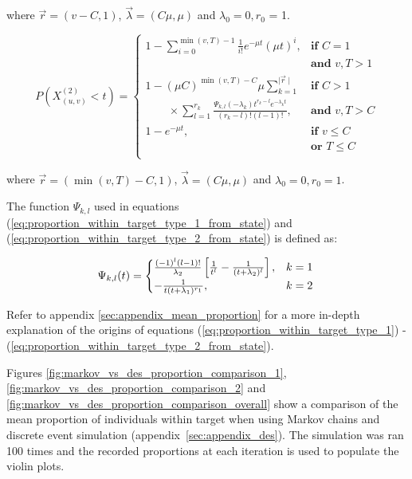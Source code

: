 \noindent
where \(\vec{r}=(v - C, 1)\), \(\vec{\lambda}=(C \mu, \mu)\) and 
\(\lambda_0 = 0, r_0\) = 1. 

\begin{equation}\label{eq:proportion_within_target_type_2_from_state}
    P(X_{(u,v)}^{(2)} < t) = 
    \begin{cases}
        1 - \sum_{i=0}^{\min(v,T)-1} \frac{1}{i!} e^{-\mu t} (\mu t)^i,  
            & \textbf{if } C = 1 \\ 
            & \textbf{and } v, T > 1 \\
        1 - (\mu C) ^ {\min(v,T) - C} \mu  
        \sum_{k=1}^{\mid \vec{r} \mid} & \textbf{if } C > 1 \\
        \qquad \times \sum_{l=1}^{r_k}
        \frac{\Psi_{k,l}(-\lambda_k)t^{r_k - l} 
        e^{-\lambda_k t}}{(r_k - l)! (l - 1)!}, 
            & \textbf{and } v, T  > C\\
        1 - e^{-\mu t}, & \textbf{if } v \leq C \\ 
            & \textbf{or } T \leq C \\
    \end{cases}
\end{equation}

\noindent
where \(\vec{r}=(\min(v, T) - C, 1)\), \(\vec{\lambda}=(C \mu, \mu)\) and
\(\lambda_0 = 0, r_0 = 1\).


The function \(\Psi_{k,l}\) used in equations 
(\ref{eq:proportion_within_target_type_1_from_state}) and 
(\ref{eq:proportion_within_target_type_2_from_state}) is defined as:

\begin{equation}
    \Psi_{k,l}(t) = 
    \begin{cases} 
        \frac{(-1)^{l} (l-1)!}{\lambda_2} \left[\frac{1}{t^l} - \frac{1}
        {(t + \lambda_2)^l}\right] , & k=1 \\
        - \frac{1}{t (t + \lambda_1)^{r_1}}, & k=2
    \end{cases} \nonumber \\
\end{equation}

Refer to appendix \ref{sec:appendix_mean_proportion} for a more in-depth 
explanation of the origins of equations 
(\ref{eq:proportion_within_target_type_1}) - 
(\ref{eq:proportion_within_target_type_2_from_state}).

Figures \ref{fig:markov_vs_des_proportion_comparison_1},
\ref{fig:markov_vs_des_proportion_comparison_2} and 
\ref{fig:markov_vs_des_proportion_comparison_overall} show a comparison of the
mean proportion of individuals within target when using Markov chains and 
discrete event simulation (appendix~\ref{sec:appendix_des}).
The simulation was ran 100 times and the recorded proportions at each iteration 
is used to populate the violin plots.

